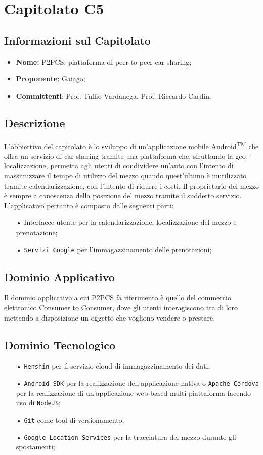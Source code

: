 \section{Capitolato C5}
\subsection{Informazioni sul Capitolato}
\begin{itemize}
	\item \textbf{Nome:} P2PCS: piattaforma di peer-to-peer car sharing;
	\item \textbf{Proponente}: Gaiago;
	\item \textbf{Committenti}: Prof. Tullio Vardanega, Prof. Riccardo Cardin.
\end{itemize}
\subsection{Descrizione}
L'obbiettivo del capitolato è lo sviluppo di un'applicazione mobile Android\textsuperscript{TM} che offra un servizio di car-sharing tramite una piattaforma che, sfruttando la geo-localizzazione, permetta agli utenti di condividere un'auto con l'intento di massimizzare il tempo di utilizzo del mezzo quando quest'ultimo è inutilizzato tramite calendarizzazione, con l'intento di ridurre i costi. Il proprietario del mezzo è sempre a conoscenza della posizione del mezzo tramite il suddetto servizio. L'applicativo pertanto è composto dalle seguenti parti:
\begin{itemize}
\item[•] Interfacce utente per la calendarizzazione, localizzazione del mezzo e prenotazione;
\item[•] \texttt{Servizi Google} per l'immagazzinamento delle prenotazioni;
\end{itemize}
\subsection{Dominio Applicativo}
Il dominio applicativo a cui P2PCS fa riferimento è quello del commercio elettronico Consumer to Consumer, dove gli utenti interagiscono tra di loro mettendo a disposizione un oggetto che vogliono vendere o prestare.
\subsection{Dominio Tecnologico}
\begin{itemize}
\item[•] \texttt{Henshin} per il servizio cloud di immagazzinamento dei dati;
\item[•] \texttt{Android SDK} per la realizzazione dell'applicazione nativa o \texttt{Apache Cordova} per la realizzazione di un'applicazione web-based multi-piattaforma facendo uso di \texttt{NodeJS};
\item[•] \texttt{Git} come tool di versionamento;
\item[•] \texttt{Google Location Services} per la tracciatura del mezzo durante gli spostamenti;
\end{itemize}

